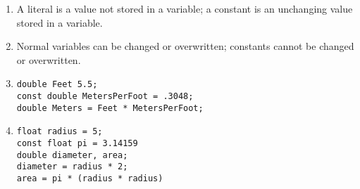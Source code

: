 \begin{enumerate}
	\item A literal is a value not stored in a variable; a constant is an unchanging value stored in a variable.
	\item Normal variables can be changed or overwritten; constants cannot be changed or overwritten.
	\item 
\noindent\begin{minipage}{\linewidth}\begin{lstlisting}
double Feet 5.5;
const double MetersPerFoot = .3048;
double Meters = Feet * MetersPerFoot;
\end{lstlisting}\end{minipage}

	\item
\noindent\begin{minipage}{\linewidth}\begin{lstlisting}
float radius = 5;
const float pi = 3.14159
double diameter, area;
diameter = radius * 2;
area = pi * (radius * radius)
\end{lstlisting}\end{minipage}


\end{enumerate}


